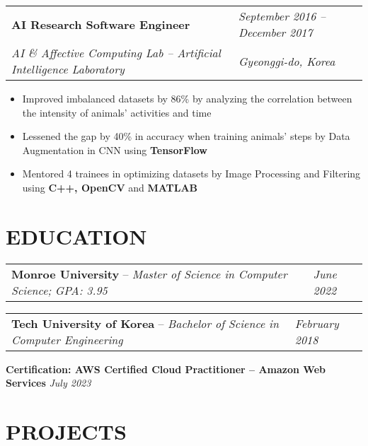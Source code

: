 \documentclass[a4paper,10.5pt]{article}
\begin{document}
\begin{tabular}{@{}p{\dimexpr\linewidth-6cm}@{}p{6cm}@{}}
\textbf{AI Research Software Engineer} &\hfill \textit{September 2016 – December 2017} \\
\textit{AI \& Affective Computing Lab – Artificial Intelligence Laboratory} & \hfill \textit{Gyeonggi-do, Korea} \\
\end{tabular}
\vspace{-1.3em} %

\begin{itemize}[topsep=0pt, partopsep=0pt, parsep=0pt, itemsep=0pt]
    \item Improved imbalanced datasets by 86\% by analyzing the correlation between the intensity of animals’ activities and time
    \item Lessened the gap by 40\% in accuracy when training animals’ steps by Data Augmentation in CNN using \textbf{TensorFlow}
    \item Mentored 4 trainees in optimizing datasets by Image Processing and Filtering using \textbf{C++, OpenCV} and \textbf{MATLAB}
\end{itemize}
\vspace{-0em} %

\section*{EDUCATION}
\begin{tabular}{@{}p{\dimexpr\linewidth-5cm}@{}p{5cm}@{}}
\textbf{Monroe University} –   \textit{Master of Science in Computer Science;}\textit{ GPA: 3.95} & \hfill \textit{June 2022}
\end{tabular}
\vspace{-1.7em} %


\begin{tabular}{@{}p{\dimexpr\linewidth-5cm}@{}p{5cm}@{}}
\textbf{Tech University of Korea} – \textit{Bachelor of Science in Computer Engineering} & \hfill \textit{February 2018} \\
\end{tabular}
\vspace{-1.7em} %

\textbf{Certification: AWS Certified Cloud Practitioner – Amazon Web Services} \hfill \textit{July 2023}
\vspace{-0em} %

\section*{PROJECTS}
\end{document}
